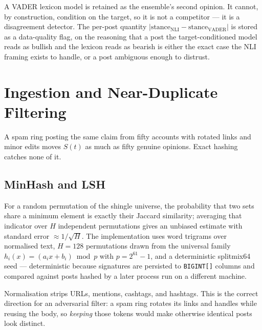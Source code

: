 \documentclass[11pt]{article}
\newcommand{\code}[1]{\texttt{\small #1}}
\begin{document}
A VADER lexicon model is retained as the ensemble's second opinion. It cannot,
by construction, condition on the target, so it is not a competitor --- it is a
disagreement detector. The per-post quantity
$|\text{stance}_{\text{NLI}} - \text{stance}_{\text{VADER}}|$ is stored as a
data-quality flag, on the reasoning that a post the target-conditioned model
reads as bullish and the lexicon reads as bearish is either the exact case the
NLI framing exists to handle, or a post ambiguous enough to distrust.

\section{Ingestion and Near-Duplicate Filtering}
\label{sec:ingest}

A spam ring posting the same claim from fifty accounts with rotated links and
minor edits moves $S(t)$ as much as fifty genuine opinions. Exact hashing catches
none of it.

\subsection{MinHash and LSH}

For a random permutation of the shingle universe, the probability that two sets
share a minimum element is exactly their Jaccard similarity; averaging that
indicator over $H$ independent permutations gives an unbiased estimate with
standard error $\approx 1/\sqrt{H}$. The implementation uses word trigrams over
normalised text, $H = 128$ permutations drawn from the universal family
$h_i(x) = (a_i x + b_i) \bmod p$ with $p = 2^{61}-1$, and a deterministic
splitmix64 seed --- deterministic because signatures are persisted to
\code{BIGINT[]} columns and compared against posts hashed by a later process run
on a different machine.

Normalisation strips URLs, mentions, cashtags, and hashtags. This is the correct
direction for an adversarial filter: a spam ring rotates its links and handles
while reusing the body, so \emph{keeping} those tokens would make otherwise
identical posts look distinct.
\end{document}
